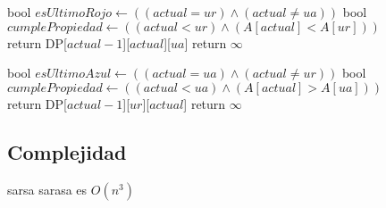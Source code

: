 \begin{algorithm}[H]
\begin{algorithmic}

    \State bool $esUltimoRojo \gets((actual = ur) \land (actual \neq ua))$ 
    \State bool $cumplePropiedad \gets((actual < ur) \land (A[actual] < A[ur]))$  \\

        \State return DP[$actual-1$][$actual$][$ua$]
    \Else
        \State return $\infty$
    \EndIf
\EndProcedure
\end{algorithmic}
\end{algorithm}


\begin{algorithm}[H]
\begin{algorithmic}

    \State bool $esUltimoAzul \gets((actual = ua) \land (actual \neq ur))$ 
    \State bool $cumplePropiedad \gets((actual < ua) \land (A[actual] > A[ua]))$  \\

        \State return DP[$actual-1$][$ur$][$actual$]
    \Else
        \State return $\infty$
    \EndIf
\EndProcedure
\end{algorithmic}
\end{algorithm}


\subsection{Complejidad}

sarsa sarasa es $O(n^3)$